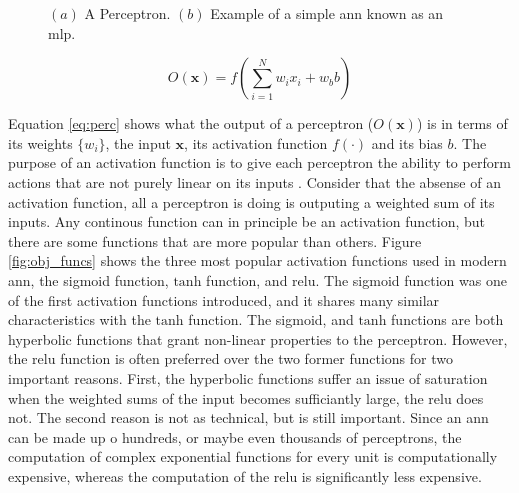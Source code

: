 \begin{figure}[H]
\begin{center}
    
\end{center}
\caption{$(a)$ A Perceptron. $(b)$ Example of a simple \acrshort{ann} known as an \acrshort{mlp}.} 
\label{fig:perc_nn}
\end{figure}

\begin{equation}
    O(\mathbf{x}) = f \left ( \sum_{i = 1}^N w_i x_i + w_b b\right )
    \label{eq:perc}
\end{equation}

Equation \eqref{eq:perc} shows what the output of a perceptron ($O(\mathbf{x})$) is in terms of its weights $\{w_i\}$, the input $\mathbf{x}$, its activation function $f(\cdot)$ and its bias $b$. The purpose of an activation function is to give each perceptron the ability to perform actions that are not purely linear on its inputs \cite{dl_book}. Consider that the absense of an activation function, all a perceptron is doing is outputing a weighted sum of its inputs. Any continous function can in principle be an activation function, but there are some functions that are more popular than others. Figure \ref{fig:obj_funcs} shows the three most popular activation functions used in modern \acrshort{ann}, the sigmoid function, $\mathrm{tanh}$ function, and \acrfull{relu}. The sigmoid function was one of the first activation functions introduced, and it shares many similar characteristics with the $\mathrm{tanh}$ function. The sigmoid, and $\mathrm{tanh}$ functions are both hyperbolic functions that grant non-linear properties to the perceptron. However, the \acrshort{relu} function is often preferred over the two former functions for two important reasons. First, the hyperbolic functions suffer an issue of saturation when the weighted sums of the input becomes sufficiantly large, the \acrshort{relu} does not. The second reason is not as technical, but is still important. Since an \acrshort{ann} can be made up o hundreds, or maybe even thousands of perceptrons, the computation of complex exponential functions for every unit is computationally expensive, whereas the computation of the \acrshort{relu} is significantly less expensive. 

